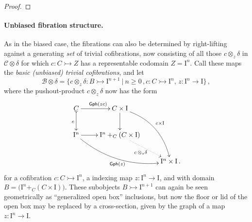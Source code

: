 \documentclass[11pt]{article}
\newcommand{\mono}{\ensuremath{\rightarrowtail}}
\newcommand{\I}{\ensuremath{\mathrm{I}}}
\theoremstyle{remark}
\theoremstyle{definition}
\begin{document}
\begin{proof}

\end{proof}

\paragraph{Unbiased fibration structure.}

As in the biased case, the fibrations can also be determined by right-lifting against a generating \emph{set} of trivial cofibrations, now consisting of all those $c \otimes_z \delta$ in $\mathcal{C}\otimes \delta$ for which $c : C \mono Z$ has a representable codomain $Z=\I^n$.  Call these maps the \emph{basic (unbiased) trivial cofibrations}, and let 
\begin{equation}\label{eq:basicunbiasedtrivcof}
\mathcal{B}\otimes \delta = \{c \otimes_z \delta : B \mono \I^{n+1}\ |\ n\geq 0\,, c : C\mono \I^n,\, z : \I^n \to \I\}\,,
\end{equation}
where the pushout-product $c\otimes_z \delta$ now has the form
\begin{equation}\label{diagram:unbiasedbasicpushoutproduct}
\xymatrix{
C \ar@{>->}[d]_{c} \ar[r]^{\mathsf{Gph}(zc)} & C\times \I \ar[d] \ar@/^4ex/ [rdd]^{c\times\I}\\
\I^n \ar@/_4ex/ [rrd]_{\mathsf{Gph}(z)} \ar[r] &  \I^n +_C (C\times\I) \ar@{.>}[rd]_{c\, \otimes_z \delta} \\
&& \I^n\times\I\,.
}
\end{equation}
for a cofibration $c : C\mono \I^n$, a indexing map $z : \I^n \to \I$, and with domain $B = \big(\I^n +_C (C\times\I)\big)$.   These subobjects $B \mono \I^{n+1}$ can again be seen geometrically as ``generalized open box'' inclusions, but now the floor or lid of the open box may be replaced by a cross-section, given by the graph of a map $z:\I^n\to \I$.
\end{document}
